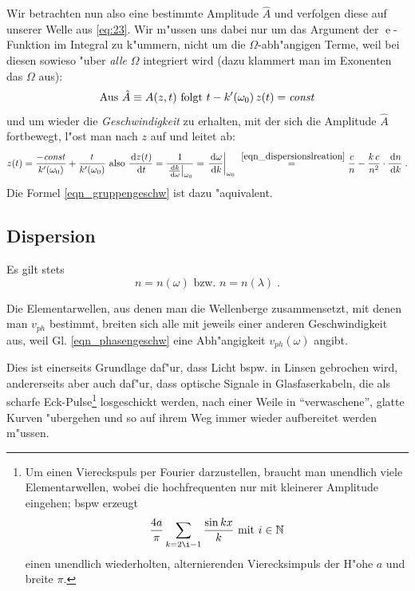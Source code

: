 \documentclass[twoside,a4paper]{book}
\newcommand{\diff}{\ensuremath{\, \mathrm{d}}}
\newcommand{\const}{\ensuremath{\text{\emph{const}}}}
\newcommand{\E}{\ensuremath{\operatorname{e}}}
\begin{document}
Wir betrachten nun also eine bestimmte Amplitude $\hat A$ und
verfolgen diese auf unserer Welle aus \eqref{eq:23}. Wir m"ussen uns
dabei nur um das Argument der $\E$-Funktion im Integral zu k"ummern,
nicht um die $\Omega$-abh"angigen Terme, weil bei diesen sowieso "uber
\emph{alle} $\Omega$ integriert wird (dazu klammert man im Exonenten
das $\Omega$ aus):
\begin{equation*}
   \text{Aus } \hat A \equiv A(z,t) \text{ folgt }
t-k'(\omega_0) \, z(t) = \const
\end{equation*}
und um wieder die \emph{Geschwindigkeit} zu erhalten, mit der sich die
Amplitude $\hat A$ fortbewegt, l"ost man nach $z$ auf und leitet ab:
\begin{equation*}
   z(t) = \frac{- \const}{k'(\omega_0)} + \frac{t}{k'(\omega_0)}
   \text{ also } \frac{\diff z(t)}{\diff t} = \frac{1}{ \left
        . \frac{\diff k}{\diff \omega} \right |_{\omega_0}} =
  \left . \frac{\diff \omega}{\diff k} \right |_{\omega_0} 
\stackrel{~\eqref{eqn_dispersionslreation}}{=}
\frac{c}{n} - \frac{k \, c}{n^2} \cdot \frac{\diff n}{\diff k} \;.
\end{equation*}
Die Formel \eqref{eqn_gruppengeschw} ist dazu "aquivalent.












\subsection{Dispersion}
\label{kap_dispersion}

Es gilt stets
\begin{equation}
   \label{eq:25}
   n = n(\omega) \text{ bzw. } n = n(\lambda) \;.
\end{equation}


Die Elementarwellen, aus denen man die Wellenberge zusammensetzt, mit
denen man $v_{ph}$ bestimmt, breiten sich alle mit jeweils einer
anderen Geschwindigkeit aus, weil Gl. \eqref{eqn_phasengeschw} eine
Abh"angigkeit $v_{ph}(\omega)$ angibt.

Dies ist einerseits Grundlage daf"ur, dass Licht bspw. in Linsen
gebrochen wird, andererseits aber auch daf"ur, dass optische Signale
in Glasfaserkabeln, die als scharfe Eck-Pulse\footnote{Um einen
  Viereckspuls per Fourier darzustellen, braucht man unendlich viele
  Elementarwellen, wobei die hochfrequenten nur mit kleinerer
  Amplitude eingehen; bspw erzeugt
$$
\frac{4a}{\pi} \sum_{k = 2\i -1} \frac{\sin kx}{k} \text{ mit } i \in
\mathbb N 
$$
einen unendlich wiederholten, alternierenden Vierecksimpuls der H"ohe
$a$ und breite $\pi$.} losgeschickt werden, nach einer Weile in
"`verwaschene"', glatte Kurven "ubergehen und so auf ihrem Weg immer
wieder aufbereitet werden m"ussen.
\end{document}
